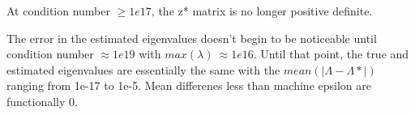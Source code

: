 \documentclass{article}\usepackage[]{graphicx}\usepackage[]{color}
\begin{document}
At condition number $\ge 1e17$, the z* matrix is no longer positive definite.

The error in the estimated eigenvalues doesn't begin to be noticeable until condition number $\approx 1e19$ with $max(\lambda)~\approx 1e16$. Until that point, the true and estimated eigenvalues are essentially the same with the $mean(|\Lambda - \Lambda*|)$ ranging from 1e-17 to 1e-5. Mean differenes less than machine epsilon are functionally 0.
\end{document}
